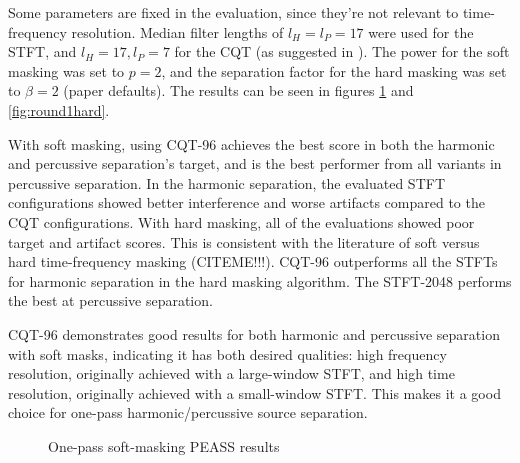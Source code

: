 \documentclass[letter,12pt]{article}
\begin{document}
Some parameters are fixed in the evaluation, since they're not relevant to time-frequency resolution. Median filter lengths of $l_{H} = l_{P} = 17$ were used for the STFT, and $l_{H} = 17, l_{P} = 7$ for the CQT (as suggested in \cite{fitzgerald2}). The power for the soft masking was set to $p = 2$, and the separation factor for the hard masking was set to $\beta = 2$ (paper defaults). The results can be seen in figures \ref{fig:round1soft} and \ref{fig:round1hard}.

With soft masking, using CQT-96 achieves the best score in both the harmonic and percussive separation's target, and is the best performer from all variants in percussive separation. In the harmonic separation, the evaluated STFT configurations showed better interference and worse artifacts compared to the CQT configurations. With hard masking, all of the evaluations showed poor target and artifact scores. This is consistent with the literature of soft versus hard time-frequency masking (CITEME!!!). CQT-96 outperforms all the STFTs for harmonic separation in the hard masking algorithm. The STFT-2048 performs the best at percussive separation.

CQT-96 demonstrates good results for both harmonic and percussive separation with soft masks, indicating it has both desired qualities: high frequency resolution, originally achieved with a large-window STFT, and high time resolution, originally achieved with a small-window STFT. This makes it a good choice for one-pass harmonic/percussive source separation.

\begin{figure}
	\centering
	\caption{One-pass soft-masking PEASS results}
	\label{fig:round1soft}
\end{figure}
\end{document}
